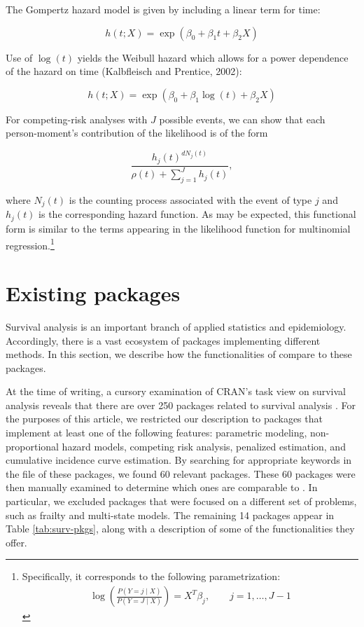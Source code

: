 \documentclass[
]{jss}
\begin{document}
The Gompertz hazard model is given by including a linear term for time:

\[ h(t;X)  = \exp(\beta_0 + \beta_1 t + \beta_2 X) \]

Use of \(\log(t)\) yields the Weibull hazard which allows for a power
dependence of the hazard on time (Kalbfleisch and Prentice, 2002):

\[ h(t;X)  = \exp(\beta_0 + \beta_1 \log(t) + \beta_2 X) \]

For competing-risk analyses with \(J\) possible events, we can show that
each person-moment's contribution of the likelihood is of the form

\[\frac{h_j(t)^{dN_j(t)}}{\rho(t) + \sum_{j=1}^Jh_j(t)},\]

where \(N_j(t)\) is the counting process associated with the event of
type \(j\) and \(h_j(t)\) is the corresponding hazard function. As may
be expected, this functional form is similar to the terms appearing in
the likelihood function for multinomial
regression.\footnote{Specifically, it corresponds to the following parametrization: \begin{align*} \log\left(\frac{P(Y=j \mid X)}{P(Y = J \mid X)}\right) = X^T\beta_j, \qquad j = 1,\ldots, J-1\end{align*}}

\hypertarget{existing-packages}{%
\section{Existing packages}\label{existing-packages}}

Survival analysis is an important branch of applied statistics and
epidemiology. Accordingly, there is a vast ecosystem of 
packages implementing different methods. In this section, we describe
how the functionalities of  compare to these packages.

At the time of writing, a cursory examination of CRAN's task view on
survival analysis reveals that there are over 250 packages related to
survival analysis \citeyearpar{survTaskView}. For the purposes of this
article, we restricted our description to packages that implement at
least one of the following features: parametric modeling,
non-proportional hazard models, competing risk analysis, penalized
estimation, and cumulative incidence curve estimation. By searching for
appropriate keywords in the  file of these packages,
we found 60 relevant packages. These 60 packages were then manually
examined to determine which ones are comparable to . In
particular, we excluded packages that were focused on a different set of
problems, such as frailty and multi-state models. The remaining 14
packages appear in Table \ref{tab:surv-pkgs}, along with a description
of some of the functionalities they offer.
\end{document}
